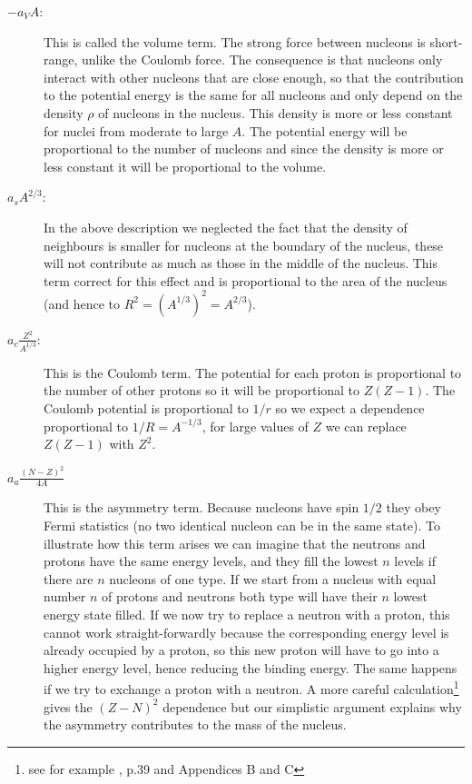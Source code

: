 \documentclass[12pt]{article}
\begin{document}
\begin{description}
\item[$-a_V A$: ] This is called the volume term. The strong force between nucleons is short-range, unlike the Coulomb force. The consequence is that nucleons only interact with other nucleons that are close enough, so that the contribution to the potential energy is the same for all nucleons and only depend on the density $\rho$ of nucleons in the nucleus. This density is more or less constant for nuclei from moderate to large $A$. The potential energy will be proportional to the number of nucleons and since the density is more or less constant it will be proportional to the volume.  
\item[$a_sA^{2/3}$:] In the above description we neglected the fact that the density of neighbours is smaller for nucleons at the boundary of the nucleus, these will not contribute as much as those in the middle of the nucleus. This term correct for this effect and is proportional to the area of the nucleus (and hence to $R^2=(A^{1/3})^2=A^{2/3}$).
\item[$a_c\frac{Z^2}{A^{1/3}}$:] This is the Coulomb term. The potential for each proton is proportional to the number of other protons so it will be proportional to $Z(Z-1)$. The Coulomb potential is proportional to $1/r$ so we expect a dependence proportional to $1/R=A^{-1/3}$, for large values of $Z$ we can replace $Z(Z-1)$ with $Z^2$.
\item[$a_a\frac{(N-Z)^2}{4A}$] This is the asymmetry term. Because nucleons have spin $1/2$ they obey Fermi statistics (no two identical nucleon can be in the same state). To illustrate how this term arises we can imagine that the neutrons and protons have the same energy levels, and they fill the lowest $n$ levels if there are $n$ nucleons of one type. If we start from a nucleus with equal number $n$ of protons and neutrons both type will have their $n$ lowest energy state filled. If we now try to replace a neutron with a proton, this cannot work straight-forwardly because the corresponding energy level is already occupied by a proton, so this new proton will have to go into a higher energy level, hence reducing the binding energy. The same happens if we try to exchange a proton with a neutron. A more careful calculation\footnote{see for example \cite{Lilley:2009zz}, p.39 and Appendices B and C} gives the $(Z-N)^2$ dependence but our simplistic argument explains why the asymmetry contributes to the mass of the nucleus.    

\end{description}
\end{document}

